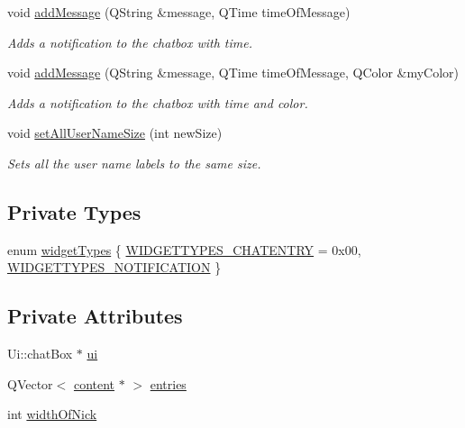 \begin{DoxyCompactItemize}
void \hyperlink{classclient_1_1chat_box_ae62f2e454789f56a4f498336158d9c52}{add\-Message} (Q\-String \&message, Q\-Time time\-Of\-Message)
\begin{DoxyCompactList}\small\item\em Adds a notification to the chatbox with time. \end{DoxyCompactList}\item 
void \hyperlink{classclient_1_1chat_box_af59419ce231d4a16d3cb89974069a5e6}{add\-Message} (Q\-String \&message, Q\-Time time\-Of\-Message, Q\-Color \&my\-Color)
\begin{DoxyCompactList}\small\item\em Adds a notification to the chatbox with time and color. \end{DoxyCompactList}\item 
void \hyperlink{classclient_1_1chat_box_a0d33977310a176a78d228eaeb1a0c39d}{set\-All\-User\-Name\-Size} (int new\-Size)
\begin{DoxyCompactList}\small\item\em Sets all the user name labels to the same size. \end{DoxyCompactList}\end{DoxyCompactItemize}
\subsection*{Private Types}
\begin{DoxyCompactItemize}
\item 
enum \hyperlink{classclient_1_1chat_box_a48584884d56cec67ac35b8e8feeb21ad}{widget\-Types} \{ \hyperlink{classclient_1_1chat_box_a48584884d56cec67ac35b8e8feeb21ada09becc7dd92ff1b9f4ff57a0eba4b097}{W\-I\-D\-G\-E\-T\-T\-Y\-P\-E\-S\-\_\-\-C\-H\-A\-T\-E\-N\-T\-R\-Y} = 0x00, 
\hyperlink{classclient_1_1chat_box_a48584884d56cec67ac35b8e8feeb21ada343c8885d52712f16acc9db401d79ebe}{W\-I\-D\-G\-E\-T\-T\-Y\-P\-E\-S\-\_\-\-N\-O\-T\-I\-F\-I\-C\-A\-T\-I\-O\-N}
 \}
\end{DoxyCompactItemize}
\subsection*{Private Attributes}
\begin{DoxyCompactItemize}
\item 
Ui\-::chat\-Box $\ast$ \hyperlink{classclient_1_1chat_box_a2382f94a54ab5b232f8bb1b4e124aeea}{ui}
\item 
Q\-Vector$<$ \hyperlink{structclient_1_1chat_box_1_1content}{content} $\ast$ $>$ \hyperlink{classclient_1_1chat_box_a7dfca52166c2acf049d5498600a4d222}{entries}
\item 
int \hyperlink{classclient_1_1chat_box_a53cb33664252841a8851f4f34077ca39}{width\-Of\-Nick}
\end{DoxyCompactItemize}


